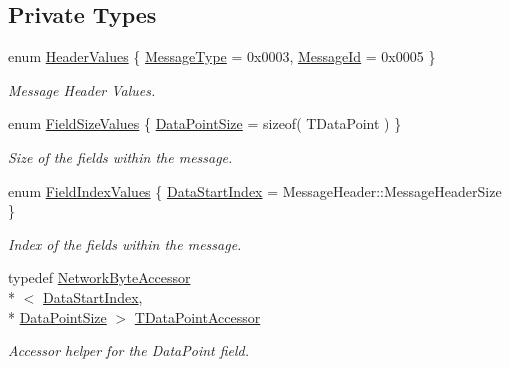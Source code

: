 \subsection*{Private Types}
\begin{DoxyCompactItemize}
\item 
enum \hyperlink{class_terra_swarm_1_1_synchronous_1_1_client_data_a529711f4bde913bbc871ba784b668cb5}{Header\-Values} \{ \hyperlink{class_terra_swarm_1_1_synchronous_1_1_client_data_a529711f4bde913bbc871ba784b668cb5acfabe23548b5afe59eb4880618ebd082}{Message\-Type} = 0x0003, 
\hyperlink{class_terra_swarm_1_1_synchronous_1_1_client_data_a529711f4bde913bbc871ba784b668cb5a2025f950fc35f0a838bc4b72d5fd5e8c}{Message\-Id} = 0x0005
 \}
\begin{DoxyCompactList}\small\item\em Message Header Values. \end{DoxyCompactList}\item 
enum \hyperlink{class_terra_swarm_1_1_synchronous_1_1_client_data_aae90a1a7ba3ea4c66542d1c3c9f2e6d9}{Field\-Size\-Values} \{ \hyperlink{class_terra_swarm_1_1_synchronous_1_1_client_data_aae90a1a7ba3ea4c66542d1c3c9f2e6d9aca053edd8f58cbd2cb277d7cfad9a419}{Data\-Point\-Size} = sizeof( T\-Data\-Point )
 \}
\begin{DoxyCompactList}\small\item\em Size of the fields within the message. \end{DoxyCompactList}\item 
enum \hyperlink{class_terra_swarm_1_1_synchronous_1_1_client_data_a46332e5dcabec8b7327933a990299886}{Field\-Index\-Values} \{ \hyperlink{class_terra_swarm_1_1_synchronous_1_1_client_data_a46332e5dcabec8b7327933a990299886a459dcd5d2d9c725f12d2b5a8175f40b7}{Data\-Start\-Index} = Message\-Header\-:\-:Message\-Header\-Size
 \}
\begin{DoxyCompactList}\small\item\em Index of the fields within the message. \end{DoxyCompactList}\item 
typedef \hyperlink{class_terra_swarm_1_1_network_byte_accessor}{Network\-Byte\-Accessor}\\*
$<$ \hyperlink{class_terra_swarm_1_1_synchronous_1_1_client_data_a46332e5dcabec8b7327933a990299886a459dcd5d2d9c725f12d2b5a8175f40b7}{Data\-Start\-Index}, \\*
\hyperlink{class_terra_swarm_1_1_synchronous_1_1_client_data_aae90a1a7ba3ea4c66542d1c3c9f2e6d9aca053edd8f58cbd2cb277d7cfad9a419}{Data\-Point\-Size} $>$ \hyperlink{class_terra_swarm_1_1_synchronous_1_1_client_data_a69ba4da130856d78eec92c6dcdb61c58}{T\-Data\-Point\-Accessor}
\begin{DoxyCompactList}\small\item\em Accessor helper for the Data\-Point field. \end{DoxyCompactList}\end{DoxyCompactItemize}
